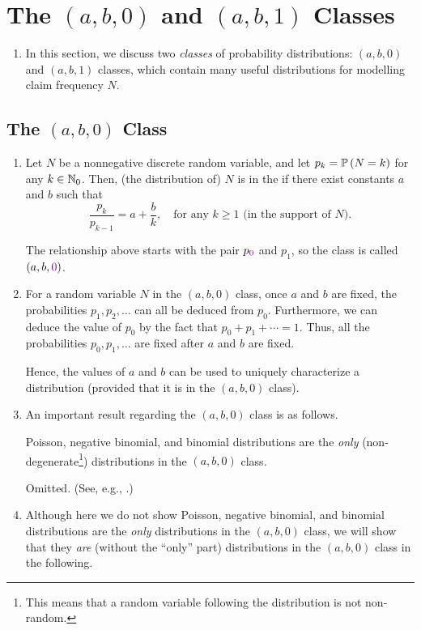 \section{The \((a,b,0)\) and \((a,b,1)\) Classes}
\label{sect:ab0-ab1-classes}
\begin{enumerate}
\item In this section, we discuss two \emph{classes} of probability
distributions: \((a,b,0)\) and \((a,b,1)\) classes, which contain many useful
distributions for modelling claim frequency \(N\).
\end{enumerate}
\subsection{The \((a,b,0)\) Class}
\begin{enumerate}
\item Let \(N\) be a nonnegative discrete random variable, and let
\(p_k=\mathbb{P}\left(N=k\right)\) for any \(k\in\mathbb{N}_0\). Then, (the distribution of) \(N\) is
in the  if there exist constants \(a\) and \(b\) such
that
\[
\frac{p_k}{p_{k-1}}=a+\frac{b}{k},\quad\text{for any \(k\ge 1\) (in the support of \(N\))}.
\]
\begin{note}
The relationship above starts with the pair \(p_{\color{violet} 0}\) and
\(p_1\), so the class is called \((a,b,{\color{violet}0})\).
\end{note}
\item For a random variable \(N\) in the \((a,b,0)\) class, once \(a\) and
\(b\) are fixed, the probabilities \(p_1,p_2,\dotsc\) can all be deduced from
\(p_0\). Furthermore, we can deduce the value of \(p_0\) by the fact that
\(p_0+p_1+\dotsb=1\). Thus, all the probabilities \(p_0,p_1,\dotsc\) are fixed
after \(a\) and \(b\) are fixed.

Hence, the values of \(a\) and \(b\) can be used to uniquely characterize a
distribution (provided that it is in the \((a,b,0)\) class).

\item An important result regarding the \((a,b,0)\) class is as follows.
\begin{theorem}
\label{thm:ab0-dist}
Poisson, negative binomial, and binomial distributions are the \emph{only}
(non-degenerate\footnote{This means that a random variable following the
distribution is not non-random.}) distributions in the \((a,b,0)\) class.
\end{theorem}
\begin{pf}
Omitted. (See, e.g., \textcite{sundt1981further}.)
\end{pf}
\item Although here we do not show Poisson, negative binomial, and binomial
distributions are the \emph{only} distributions in the \((a,b,0)\) class, we
will show that they \emph{are} (without the ``only'' part) distributions in the
\((a,b,0)\) class in the following.


\end{enumerate}
